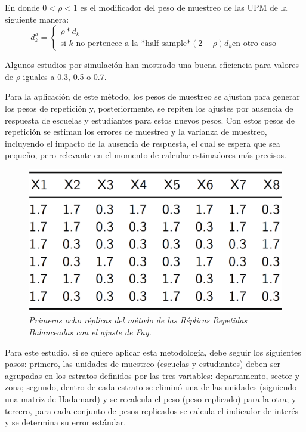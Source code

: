 \documentclass[12pt,spanish,]{book}
\begin{document}
En donde \(0<\rho<1\) es el modificador del peso de muestreo de las UPM de la siguiente manera:
\[
d_k^a=
\begin{cases}
\rho*d_k\\ \text{si $k$ no pertenece a la *half-sample*}
(2-\rho)d_k \text{en otro caso}
\end{cases}
\]

Algunos estudios por simulación han mostrado una buena eficiencia para valores de \(\rho\) iguales a 0.3, 0.5 o 0.7.

Para la aplicación de este método, los pesos de muestreo se ajustan para generar los pesos de repetición y, posteriormente, se repiten los ajustes por ausencia de respuesta de escuelas y estudiantes para estos nuevos pesos. Con estos pesos de repetición se estiman los errores de muestreo y la varianza de muestreo, incluyendo el impacto de la ausencia de respuesta, el cual se espera que sea pequeño, pero relevante en el momento de calcular estimadores más precisos.

\begin{figure}
\centering
\includegraphics{Pics/22.png}
\caption{\emph{Primeras ocho réplicas del método de las Réplicas Repetidas Balanceadas con el ajuste de Fay.}}
\end{figure}

Para este estudio, si se quiere aplicar esta metodología, debe seguir los siguientes pasos: primero, las unidades de muestreo (escuelas y estudiantes) deben ser agrupadas en los estratos definidos por las tres variables: departamento, sector y zona; segundo, dentro de cada estrato se eliminó una de las unidades (siguiendo una matriz de Hadamard) y se recalcula el peso (peso replicado) para la otra; y tercero, para cada conjunto de pesos replicados se calcula el indicador de interés y se determina su error estándar.
\end{document}
